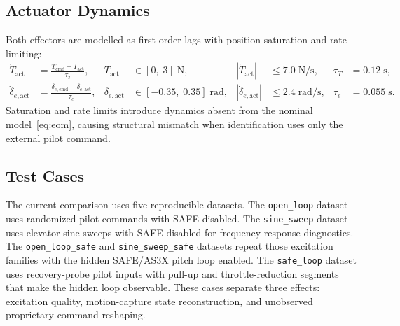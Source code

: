 \documentclass[11pt]{article}
\begin{document}
\subsection*{Actuator Dynamics}
Both effectors are modelled as first-order lags with position saturation and rate
limiting:
\begin{align}
    \dot{T}_{\mathrm{act}}
        &= \frac{T_{\mathrm{cmd}} - T_{\mathrm{act}}}{\tau_T},
    & T_{\mathrm{act}}   &\in [0,\;3]\;\text{N},
    & |\dot{T}_{\mathrm{act}}|   &\le 7.0\;\text{N/s},
    & \tau_T   &= 0.12\;\text{s},
    \label{eq:Tact}\\[4pt]
    \dot{\delta}_{e,\mathrm{act}}
        &= \frac{\delta_{e,\mathrm{cmd}} - \delta_{e,\mathrm{act}}}{\tau_e},
    & \delta_{e,\mathrm{act}} &\in [-0.35,\;0.35]\;\text{rad},
    & |\dot{\delta}_{e,\mathrm{act}}| &\le 2.4\;\text{rad/s},
    & \tau_e   &= 0.055\;\text{s}.
    \label{eq:eact}
\end{align}
Saturation and rate limits introduce dynamics absent from the nominal
model~\eqref{eq:eom}, causing structural mismatch when identification uses only
the external pilot command.
\subsection*{Test Cases} \label{subsec:testcase}
The current comparison uses five reproducible datasets. The \texttt{open\_loop}
dataset uses randomized pilot commands with SAFE disabled. The
\texttt{sine\_sweep} dataset uses elevator sine sweeps with SAFE disabled for
frequency-response diagnostics. The \texttt{open\_loop\_safe} and
\texttt{sine\_sweep\_safe} datasets repeat those excitation families with the
hidden SAFE/AS3X pitch loop enabled. The \texttt{safe\_loop} dataset uses
recovery-probe pilot inputs with pull-up and throttle-reduction segments that
make the hidden loop observable. These cases separate three effects: excitation
quality, motion-capture state reconstruction, and unobserved proprietary
command reshaping.
\end{document}
